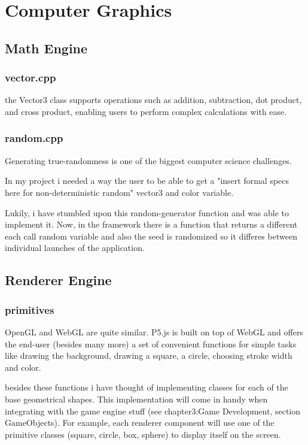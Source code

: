 \chapter{Computer Graphics}

    \section{Math Engine}
        \subsection{vector.cpp}
            the Vector3 class supports operations such as addition, subtraction, dot product, and cross product, enabling users to perform complex calculations with ease.
        \subsection{random.cpp}
            Generating true-randomness is one of the biggest computer science challenges. 

            In my project i needed a way the user to be able to get a "insert formal specs here for non-deterministic random" vector3 and color variable. 

            Lukily, i have stumbled upon this random-generator function and was able to implement it. Now, in the framework there is a function that returns a different each call random variable and also the seed is randomized so it differes between individual launches of the application. 
    \section{Renderer Engine}
        \subsection{primitives}
            OpenGL and WebGL are quite similar. P5.js is built on top of WebGL and offers the end-user (besides many more) a set of convenient functions for simple tasks like drawing the background, drawing a square, a circle, choosing stroke width and color.
        
            besides these functions i have thought of implementing classes for each of the base geometrical shapes. This implementation will come in handy when integrating with the game engine stuff (see chapter3:Game Development, section GameObjects). For example, each renderer component will use one of the primitive classes (square, circle, box, sphere) to display itself on the screen.
            
